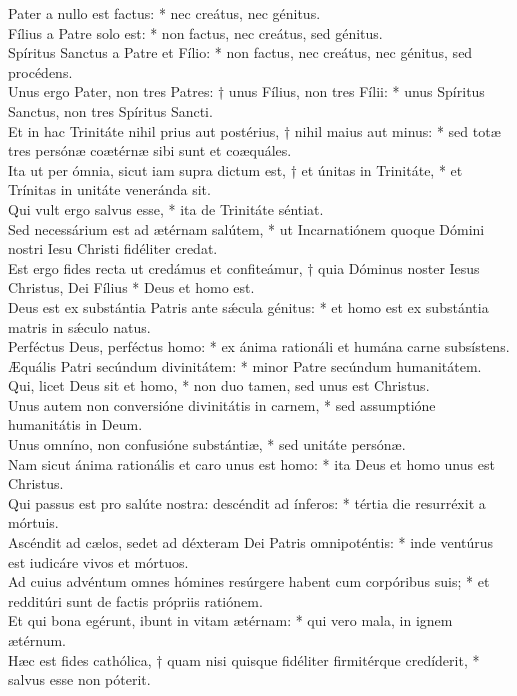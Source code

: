{	Pater a nullo est factus: * nec creátus, nec génitus. \\
	Fílius a Patre solo est: * non factus, nec creátus, sed génitus. \\
	Spíritus Sanctus a Patre et Fílio: * non factus, nec creátus, nec génitus, sed procédens. \\
	Unus ergo Pater, non tres Patres: † unus Fílius, non tres Fílii: * unus Spíritus Sanctus, non tres Spíritus Sancti. \\
	Et in hac Trinitáte nihil prius aut postérius, † nihil maius aut minus: * sed totæ tres persónæ coætérnæ sibi sunt et coæquáles. \\
	Ita ut per ómnia, sicut iam supra dictum est, † et únitas in Trinitáte, * et Trínitas in unitáte veneránda sit. \\
	Qui vult ergo salvus esse, * ita de Trinitáte séntiat. \\
	Sed necessárium est ad ætérnam salútem, * ut Incarnatiónem quoque Dómini nostri Iesu Christi fidéliter credat. \\
	Est ergo fides recta ut credámus et confiteámur, † quia Dóminus noster Iesus Christus, Dei Fílius * Deus et homo est. \\
	Deus est ex substántia Patris ante sǽcula génitus: * et homo est ex substántia matris in sǽculo natus. \\
	Perféctus Deus, perféctus homo: * ex ánima rationáli et humána carne subsístens. \\
	Æquális Patri secúndum divinitátem: * minor Patre secúndum humanitátem. \\
	Qui, licet Deus sit et homo, * non duo tamen, sed unus est Christus. \\
	Unus autem non conversióne divinitátis in carnem, * sed assumptióne humanitátis in Deum. \\
	Unus omníno, non confusióne substántiæ, * sed unitáte persónæ. \\
	Nam sicut ánima rationális et caro unus est homo: * ita Deus et homo unus est Christus. \\
	Qui passus est pro salúte nostra: descéndit ad ínferos: * tértia die resurréxit a mórtuis. \\
	Ascéndit ad cælos, sedet ad déxteram Dei Patris omnipoténtis: * inde ventúrus est iudicáre vivos et mórtuos. \\
	Ad cuius advéntum omnes hómines resúrgere habent cum corpóribus suis; * et redditúri sunt de factis própriis ratiónem. \\
	Et qui bona egérunt, ibunt in vitam ætérnam: * qui vero mala, in ignem ætérnum. \\
	Hæc est fides cathólica, † quam nisi quisque fidéliter firmitérque credíderit, * salvus esse non póterit.
}

